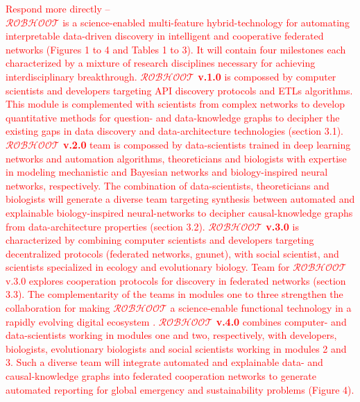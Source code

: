 \documentclass[11pt, a4paper]{article} %
\begin{document}
  \textcolor{red}{Respond more directly -- \\
  {\bf $\mathcal{ROBHOOT}$} is a science-enabled multi-feature
  hybrid-technology for automating interpretable data-driven discovery
  in intelligent and cooperative federated networks (Figures 1 to 4
  and Tables 1 to 3). It will contain four milestones each
  characterized by a mixture of research disciplines necessary for
  achieving interdisciplinary breakthrough. {\bf $\mathcal{ROBHOOT}$
    v.1.0} is compossed by computer scientists and developers
  targeting API discovery protocols and ETLs algorithms. This module
  is complemented with scientists from complex networks to develop
  quantitative methods for question- and data-knowledge graphs to
  decipher the existing gaps in data discovery and data-architecture
  technologies (section 3.1). {\bf $\mathcal{ROBHOOT}$ v.2.0} team is
  compossed by data-scientists trained in deep learning networks and
  automation algorithms, theoreticians and biologists with expertise
  in modeling mechanistic and Bayesian networks and biology-inspired
  neural networks, respectively. The combination of data-scientists,
  theoreticians and biologists will generate a diverse team targeting
  synthesis between automated and explainable biology-inspired
  neural-networks to decipher causal-knowledge graphs from
  data-architecture properties (section 3.2). {\bf $\mathcal{ROBHOOT}$
    v.3.0} is characterized by combining computer scientists and
  developers targeting decentralized protocols (federated networks,
  gnunet), with social scientist, and scientists specialized in
  ecology and evolutionary biology. Team for $\mathcal{ROBHOOT}$ v.3.0
  explores cooperation protocols for discovery in federated networks
  (section 3.3). The complementarity of the teams in modules one to
  three strengthen the collaboration for making $\mathcal{ROBHOOT}$ a
  science-enable functional technology in a rapidly evolving digital
  ecosystem \citep{Soto-Valero2019}. {\bf $\mathcal{ROBHOOT}$ v.4.0}
  combines computer- and data-scientists working in modules one and
  two, respectively, with developers, biologists, evolutionary
  biologists and social scientists working in modules 2 and 3. Such a
  diverse team will integrate automated and explainable data- and
  causal-knowledge graphs into federated cooperation networks to
  generate automated reporting for global emergency and sustainability
  problems (Figure 4).}
\end{document}
